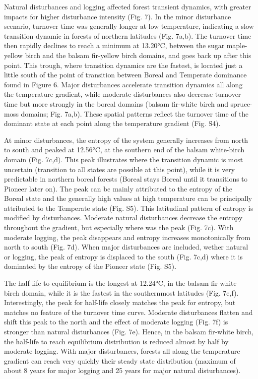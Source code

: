 \documentclass[a4paperpaper,]{article}
\begin{document}
Natural disturbances and logging affected forest transient dynamics,
with greater impacts for higher disturbance intensity (Fig. 7). In the
minor disturbance scenario, turnover time was generally longer at low
temperature, indicating a slow transition dynamic in forests of northern
latitudes (Fig. 7a,b). The turnover time then rapidly declines to reach
a minimum at 13.20°C, between the sugar maple-yellow birch and the
balsam fir-yellow birch domains, and goes back up after this point. This
trough, where transition dynamics are the fastest, is located just a
little south of the point of transition between Boreal and Temperate
dominance found in Figure 6. Major disturbances accelerate transition
dynamics all along the temperature gradient, while moderate disturbances
also decrease turnover time but more strongly in the boreal domains
(balsam fir-white birch and spruce-moss domains; Fig. 7a,b). These
spatial patterns reflect the turnover time of the dominant state at each
point along the temperature gradient (Fig. S4).

At minor disturbances, the entropy of the system generally increases
from north to south and peaked at 12.56°C, at the southern end of the
balsam white-birch domain (Fig. 7c,d). This peak illustrates where the
transition dynamic is most uncertain (transition to all states are
possible at this point), while it is very predictable in northern boreal
forests (Boreal stays Boreal until it transitions to Pioneer later on).
The peak can be mainly attributed to the entropy of the Boreal state and
the generally high values at high temperature can be principally
attributed to the Temperate state (Fig. S5). This latitudinal pattern of
entropy is modified by disturbances. Moderate natural disturbances
decrease the entropy throughout the gradient, but especially where was
the peak (Fig. 7c). With moderate logging, the peak disappears and
entropy increases monotonically from north to south (Fig. 7d). When
major disturbances are included, wether natural or logging, the peak of
entropy is displaced to the south (Fig. 7c,d) where it is dominated by
the entropy of the Pioneer state (Fig. S5).

The half-life to equilibrium is the longest at 12.24°C, in the balsam
fir-white birch domain, while it is the fastest in the southernmost
latitudes (Fig. 7e,f). Interestingly, the peak for half-life closely
matches the peak for entropy, but matches no feature of the turnover
time curve. Moderate disturbances flatten and shift this peak to the
north and the effect of moderate logging (Fig. 7f) is stronger than
natural disturbances (Fig. 7e). Hence, in the balsam fir-white birch,
the half-life to reach equilibrium distribution is reduced almost by
half by moderate logging. With major disturbances, forests all along the
temperature gradient can reach very quickly their steady state
distribution (maximum of about 8 years for major logging and 25 years
for major natural disturbances).
\end{document}
